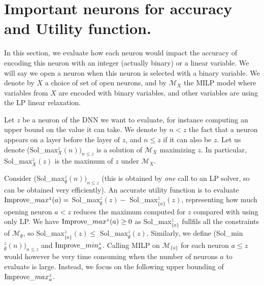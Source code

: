 \section{Important neurons for accuracy and Utility function.}

In this section, we evaluate how each neuron would impact the accuracy of encoding this neuron with an integer (actually binary) or a linear variable. We will say we open a neuron when this neuron is selected with a binary variable. We denote by $X$ a choice of set of open neurons, and by $\mathcal{M}_X$ the MILP model where variables from $X$ are encoded with binary variables, and other variables are using the LP linear relaxation.

Let $z$ be a neuron of the DNN we want to evaluate, for instance computing an upper bound on the value it can take. We denote by $n< z$ the fact that a neuron appears on a layer before the layer of $z$, and $n \leq z$ if it can also be $z$.
Let us denote (Sol\_max$_X^z(n))_{n \leq z}$ is a solution of $\mathcal{M}_X$ 
maximizing $z$. In particular, Sol\_max$_X^z(z)$ is the maximum of $z$ under $\mathcal{M}_X$.

Consider (Sol\_max$_\emptyset^z(n))_{n \leq z}$ (this is obtained by {\em one} call to an LP solver, so can be obtained very efficiently).
An accurate utility function is to evaluate 
$\mathrm{Improve}\_max^z(a)=$ Sol\_max$_\emptyset^z(z) -$ Sol\_max$_{\{a\}}^z(z)$, 
representing how much opening neuron $a < z$ reduces the maximum computed for $z$
compared with using only LP. 
We have $\mathrm{Improve}\_max^z(a)\geq 0$ as Sol\_max$_{\{a\}}^z$ fullfils all the constraints of 
$\mathcal{M}_\emptyset$, so Sol\_max$_{\{a\}}^z(z) \leq$ Sol\_max$_\emptyset^z(z)$.
Similarly, we define (Sol\_min$_\emptyset^z(n))_{n \leq z}$ and 
$\mathrm{Improve}\_min_a^z$. Calling MILP on $\mathcal{M}_{\{a\}}$ for each neuron $a \leq z$
would however be very time consuming when the number of neurons $a$ to evaluate is large.
Instead, we focus on the following upper bounding of $\mathrm{Improve}\_max_a^z$.








